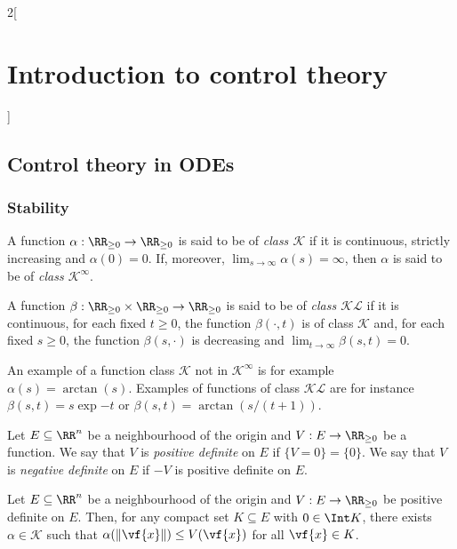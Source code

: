 \documentclass[../../../main_math.tex]{subfiles}
\begin{document}
\begin{multicols}{2}[\section{Introduction to control theory}]
  \subsection{Control theory in ODEs}
  \subsubsection{Stability}
  \begin{definition}
    A function $\alpha: \RR_{\geq 0} \to \RR_{\geq 0}$ is said to be of \emph{class $\mathcal{K}$} if it is continuous, strictly increasing and $\alpha(0) = 0$. If, moreover, $\displaystyle \lim_{s \to \infty} \alpha(s) = \infty$, then $\alpha$ is said to be of \emph{class $\mathcal{K}^\infty$}.
  \end{definition}
  \begin{definition}
    A function $\beta: \RR_{\geq 0} \times \RR_{\geq 0} \to \RR_{\geq 0}$ is said to be of \emph{class $\mathcal{KL}$} if it is continuous, for each fixed $t \geq 0$, the function $\beta(\cdot, t)$ is of class $\mathcal{K}$ and, for each fixed $s \geq 0$, the function $\beta(s, \cdot)$ is decreasing and $\displaystyle \lim_{t \to \infty} \beta(s, t) = 0$.
  \end{definition}
  \begin{remark}
    An example of a function class $\mathcal{K}$ not in $\mathcal{K}^\infty$ is for example $\alpha(s)=\arctan(s)$. Examples of functions of class $\mathcal{KL}$ are for instance $\beta(s, t) = s\exp{-t}$ or $\beta(s, t) = \arctan(s/(t+1))$.
  \end{remark}
  \begin{definition}
    Let $E\subseteq \RR^n$ be a neighbourhood of the origin and $V: E \to \RR_{\geq 0}$ be a function. We say that $V$ is \emph{positive definite} on $E$ if $\{V=0\} = \{0\}$. We say that $V$ is \emph{negative definite} on $E$ if $-V$ is positive definite on $E$.
  \end{definition}
  \begin{lemma}\label{ICT:lemmaK}
    Let $E\subseteq \RR^n$ be a neighbourhood of the origin and $V: E \to \RR_{\geq 0}$ be positive definite on $E$. Then, for any compact set $K \subseteq E$ with $0\in \Int K$, there exists $\alpha \in \mathcal{K}$ such that $\alpha(\norm{\vf{x}}) \leq V(\vf{x})$ for all $\vf{x} \in K$.

\end{lemma}
\end{multicols}
\end{document}
